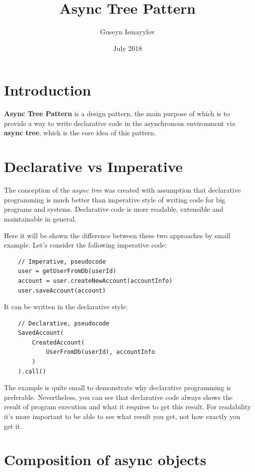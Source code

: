 \documentclass{article}
\title{Async Tree Pattern}
\author{Guseyn Ismayylov}
\date{July 2018}
\begin{document}
\newcommand{\cit}[1]{\texttt{#1}}

\maketitle

\section{Introduction}

\textbf{Async Tree Pattern} is a design pattern, the main purpose of which is to provide a way to write declarative code in the asynchronous environment via \textbf{async tree}, which is the core idea of this pattern.

\section{Declarative vs Imperative}

The conception of the \textit{async tree} was created with assumption that declarative programming is much better than imperative style of writing code for big programs and systems. Declarative code is more readable, extensible and maintainable in general.

Here it will be shown the difference between these two approaches by small example. Let's consider the following imperative code:  


\begin{verbatim}
    // Imperative, pseudocode
    user = getUserFromDb(userId)
    account = user.createNewAccount(accountInfo)
    user.saveAccount(account)
\end{verbatim}

It can be written in the declarative style:


\begin{verbatim}
    // Declarative, pseudocode
    SavedAccount(
        CreatedAccount(
            UserFromDb(userId), accountInfo
        )
    ).call()
\end{verbatim}

The example is quite small to demonstrate why declarative programming is preferable. Nevertheless, you can see that declarative code always shows the result of program execution and what it requires to get this result. For readability it's more important to be able to see what result you get, not how exactly you get it.

\section{Composition of async objects}
\end{document}
